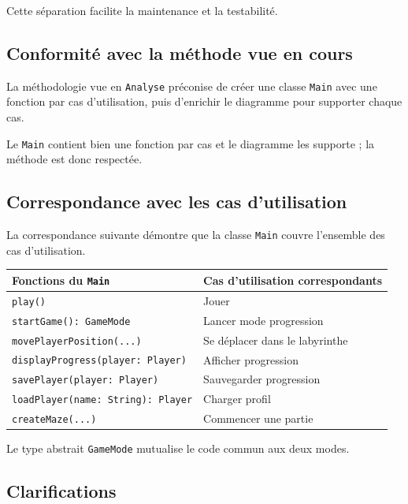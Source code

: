 \documentclass{butexFR}
\begin{document}
Cette séparation facilite la maintenance et la testabilité.

\subsection{Conformité avec la méthode vue en cours}

La méthodologie vue en \texttt{Analyse} préconise de créer une classe \texttt{Main} avec une fonction par cas d'utilisation, puis d'enrichir le diagramme pour supporter chaque cas.

Le \texttt{Main} contient bien une fonction par cas et le diagramme les supporte ; la méthode est donc respectée.

\subsection{Correspondance avec les cas d'utilisation}

La correspondance suivante démontre que la classe \texttt{Main} couvre l'ensemble des cas d'utilisation.

\vspace{1em}
\begin{center}
\begin{tabular}{|p{5cm}|p{8cm}|}
\hline
\textbf{Fonctions du \texttt{Main}} & \textbf{Cas d'utilisation correspondants} \\
\hline
\texttt{play()} & Jouer \\
\hline
\texttt{startGame(): GameMode} & Lancer mode progression\\
\hline
\texttt{movePlayerPosition(...)} & Se déplacer dans le labyrinthe \\
\hline
\texttt{displayProgress(player: Player)} & Afficher progression \\
\hline
\texttt{savePlayer(player: Player)} & Sauvegarder progression\\
\hline
\texttt{loadPlayer(name: String): Player} & Charger profil \\
\hline
\texttt{createMaze(...)} & Commencer une partie\\
\hline
\end{tabular}
\end{center}
\vspace{1em}

Le type abstrait \texttt{GameMode} mutualise le code commun aux deux modes.

\subsection{Clarifications}
\end{document}
